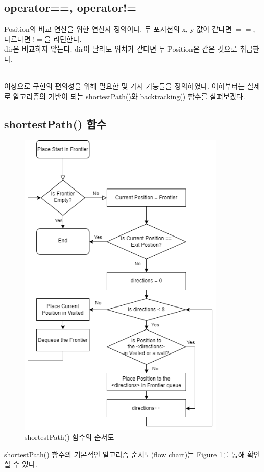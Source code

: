 \documentclass{article}
\begin{document}
\subsection{operator==, operator!=}
Position의 비교 연산을 위한 연산자 정의이다. 두 포지션의 x, y 값이 같다면 $==$, 다르다면 $!=$을 리턴한다.\\
dir은 비교하지 않는다. dir이 달라도 위치가 같다면 두 Position은 같은 것으로 취급한다.

\\
이상으로 구현의 편의성을 위해 필요한 몇 가지 기능들을 정의하였다. 이하부터는 실제로 알고리즘의 기반이 되는 shortestPath()와 backtracking() 함수를 살펴보겠다.
\subsection{shortestPath() 함수}

\FloatBarrier
\begin{figure} [h]
    \centering
    \includegraphics[height = 15cm]{flow chart.drawio.png}
    \caption{shortestPath() 함수의 순서도}
    \label{fig:flowChart}
\end{figure}
\FloatBarrier
shortestPath() 함수의 기본적인 알고리즘 순서도(flow chart)는 Figure \ref{fig:flowChart}를 통해 확인할 수 있다.
\end{document}
